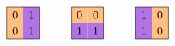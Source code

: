 \documentclass[12pt]{article}
\theoremstyle{definition} %
\begin{document}
\[\begin{tikzpicture}[scale=1]
\begin{scope}[shift={(8,0)}]
        \path[fill=actOrange] (0,.5) rectangle ++(.5,.5); 
        \path[fill=actPurple] (.5,.5) rectangle ++(.5,.5);
        \path[fill=actOrange] (0,0) rectangle ++(.5,.5);
        \path[fill=actPurple] (.5,0) rectangle ++(.5,.5);
        \draw (0,0) rectangle (1,1);
        \draw (.25,.75) node{$0$}; \draw (.75,.75) node{$1$};
        \draw (.25,.25) node{$0$}; \draw (.75,.25) node{$1$};
    \end{scope}
    \begin{scope}[shift={(10,0)}]
        \path[fill=actOrange] (0,.5) rectangle ++(.5,.5); 
        \path[fill=actOrange] (.5,.5) rectangle ++(.5,.5);
        \path[fill=actPurple] (0,0) rectangle ++(.5,.5);
        \path[fill=actPurple] (.5,0) rectangle ++(.5,.5);
        \draw (0,0) rectangle (1,1);
        \draw (.25,.75) node{$0$}; \draw (.75,.75) node{$0$};
        \draw (.25,.25) node{$1$}; \draw (.75,.25) node{$1$};
    \end{scope}
    \begin{scope}[shift={(12,0)}]
        \path[fill=actPurple] (0,.5) rectangle ++(.5,.5); 
        \path[fill=actOrange] (.5,.5) rectangle ++(.5,.5);
        \path[fill=actPurple] (0,0) rectangle ++(.5,.5);
        \path[fill=actOrange] (.5,0) rectangle ++(.5,.5);
        \draw (0,0) rectangle (1,1);
        \draw (.25,.75) node{$1$}; \draw (.75,.75) node{$0$};
        \draw (.25,.25) node{$1$}; \draw (.75,.25) node{$0$};
    \end{scope}
\end{tikzpicture}
\]

\vfill
\end{document}
